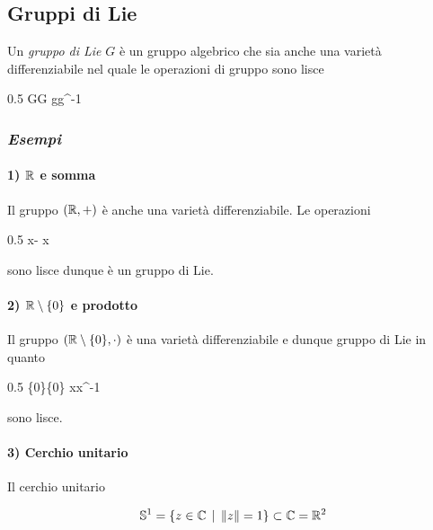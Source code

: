 \subsection{Gruppi di Lie}

Un \textit{gruppo di Lie} $ G $ è un gruppo algebrico che sia anche una varietà differenziabile nel quale le operazioni di gruppo sono lisce

	{0.5}{%
				{G}{G}
				{g}{g^{-1}}
			}

\subsubsection{\textit{Esempi}}

\paragraph{1) $ \mathbb{R} $ e somma}

Il gruppo $ (\mathbb{R},+) $ è anche una varietà differenziabile. Le operazioni

	{0.5}{%
				{\R}{\R}
				{x}{- x}
			}

sono lisce dunque è un gruppo di Lie.

\paragraph{2) $ \mathbb{R} \setminus \{0\} $ e prodotto}

Il gruppo $ (\mathbb{R} \setminus \{0\},\cdot) $ è una varietà differenziabile e dunque gruppo di Lie in quanto

	{0.5}{%
				{\R \setminus \{0\}}{\R \setminus \{0\}}
				{x}{x^{-1}}
			}

sono lisce.

\paragraph{3) Cerchio unitario}

Il cerchio unitario

\begin{equation}
	\mathbb{S}^{1} = \{ z \in \mathbb{C} \, \mid \, \norm{z} = 1 \} \subset \mathbb{C} = \mathbb{R}^{2}
\end{equation}

